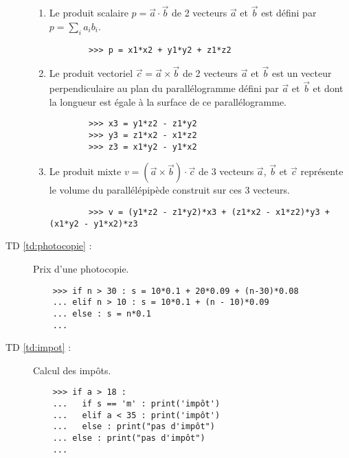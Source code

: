 \begin{description}
\begin{enumerate}
	\item Le produit scalaire $p = \vec{a}\cdot\vec{b}$ de 2 vecteurs $\vec{a}$ et $\vec{b}$ est défini par
		$\displaystyle p = \sum_i a_ib_i$.

		\begin{py}{12cm}
		\begin{verbatim}
		>>> p = x1*x2 + y1*y2 + z1*z2
		\end{verbatim}
		\end{py}

	\item Le produit vectoriel $\vec{c} = \vec{a} \times \vec{b}$ de 2 vecteurs $\vec{a}$ et $\vec{b}$ 
		est un vecteur perpendiculaire au plan du parallélogramme défini par $\vec{a}$ et $\vec{b}$
		et dont la longueur est égale à la surface de ce parallélogramme.

		\begin{py}{12cm}
		\begin{verbatim}
		>>> x3 = y1*z2 - z1*y2
		>>> y3 = z1*x2 - x1*z2
		>>> z3 = x1*y2 - y1*x2
		\end{verbatim}
		\end{py}

	\item Le produit mixte $v = (\vec{a}\times\vec{b})\cdot \vec{c}$ de 3 vecteurs $\vec{a}$, 
		$\vec{b}$ et $\vec{c}$ représente le volume du parallélépipède construit sur ces 3 vecteurs.

		\begin{py}{12cm}
		\begin{verbatim}
		>>> v = (y1*z2 - z1*y2)*x3 + (z1*x2 - x1*z2)*y3 + (x1*y2 - y1*x2)*z3
		\end{verbatim}
		\end{py}
	\end{enumerate}

\item[TD \ref{td:photocopie} :] Prix d'une photocopie.\\
	\begin{py}{12cm}
	\begin{verbatim}
	>>> if n > 30 : s = 10*0.1 + 20*0.09 + (n-30)*0.08
	... elif n > 10 : s = 10*0.1 + (n - 10)*0.09
	... else : s = n*0.1
	...
	\end{verbatim}
	\end{py}

\item[TD \ref{td:impot} :] Calcul des impôts.\\
	\begin{py}{12cm}
	\begin{verbatim}
	>>> if a > 18 :
	...   if s == 'm' : print('impôt')
	...   elif a < 35 : print('impôt')
	...   else : print("pas d'impôt")
	... else : print("pas d'impôt")
	...
	\end{verbatim}
	\end{py}


\end{description}
